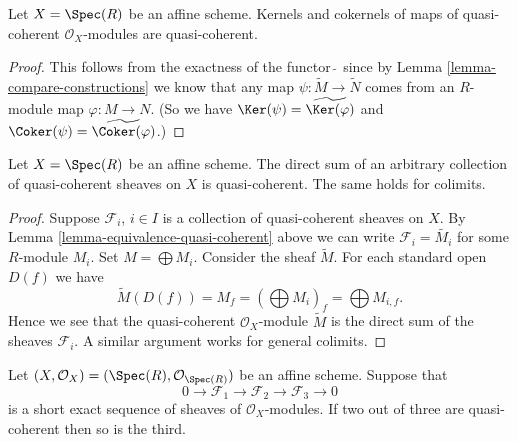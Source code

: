 \begin{lemma}
\label{lemma-kernel-cokernel-quasi-coherent}
Let $X = \Spec(R)$ be an affine scheme.
Kernels and cokernels of maps of quasi-coherent
$\mathcal{O}_X$-modules are quasi-coherent.
\end{lemma}

\begin{proof}
This follows from the exactness of the functor $\widetilde{\ }$
since by Lemma \ref{lemma-compare-constructions} we know that any map
$\psi : \widetilde{M} \to \widetilde{N}$ comes from
an $R$-module map $\varphi : M \to N$. (So we have
$\Ker(\psi) = \widetilde{\Ker(\varphi)}$ and
$\Coker(\psi) = \widetilde{\Coker(\varphi)}$.)
\end{proof}

\begin{lemma}
\label{lemma-colimit-quasi-coherent}
Let $X = \Spec(R)$ be an affine scheme.
The direct sum of an arbitrary collection of quasi-coherent sheaves
on $X$ is quasi-coherent. The same holds for colimits.
\end{lemma}

\begin{proof}
Suppose $\mathcal{F}_i$, $i \in I$ is a collection of quasi-coherent
sheaves on $X$. By Lemma \ref{lemma-equivalence-quasi-coherent}
above we can write $\mathcal{F}_i = \widetilde{M_i}$ for some $R$-module
$M_i$. Set $M = \bigoplus M_i$. Consider the sheaf $\widetilde{M}$.
For each standard open $D(f)$ we have
$$
\widetilde{M}(D(f)) = M_f =
\left(\bigoplus M_i\right)_f =
\bigoplus M_{i, f}.
$$
Hence we see that the quasi-coherent $\mathcal{O}_X$-module
$\widetilde{M}$ is the direct sum of the sheaves $\mathcal{F}_i$.
A similar argument works for general colimits.
\end{proof}

\begin{lemma}
\label{lemma-extension-quasi-coherent}
Let $(X, \mathcal{O}_X) = (\Spec(R), \mathcal{O}_{\Spec(R)})$
be an affine scheme. Suppose that
$$
0 \to
\mathcal{F}_1 \to
\mathcal{F}_2 \to
\mathcal{F}_3 \to
0
$$
is a short exact sequence of sheaves of $\mathcal{O}_X$-modules.
If two out of three are quasi-coherent then so is the third.
\end{lemma}

